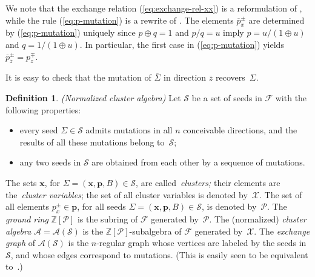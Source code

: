 \documentclass[letterpaper]{amsart}
\numberwithin{equation}{section}
\theoremstyle{definition}
\newtheorem{definition}[theorem]{Definition}
\def\AA{\mathcal{A}}
\def\ZZ{\mathbb{Z}}
\def\PP{\mathbb{P}}
\def\xx{\mathbf{x}}
\def\pp{\mathbf{p}}
\def\FFcal{\mathcal{F}}
\begin{document}
We note that the exchange relation (\ref{eq:exchange-rel-xx}) is a 
reformulation of \cite[(2.2),(4.2)]{fz-clust1}, 
while the rule (\ref{eq:p-mutation}) is a rewrite of \cite[(5.4), 
(5.5)]{fz-clust1}. 
The elements $\overline p^\pm_x$ are determined by 
(\ref{eq:p-mutation}) uniquely since $p \oplus q = 1$ and 
$p/q = u$ imply $p = u/(1 \oplus u)$ and $q = 1/(1 \oplus u)$. 
In particular, the first case in (\ref{eq:p-mutation}) yields 
$\overline p_{\overline z}^\pm = p_z^\mp$. 
 
It is easy to check that the mutation of $\overline\Sigma$ in direction $\overline z$ recovers~$\Sigma$. 
 
\begin{definition} 
\label{def:cluster-algebra} 
\emph{(Normalized cluster algebra)} 
Let $\mathcal{S}$ be a set of seeds in $\mathcal{F}$ with 
the following properties: 
\begin{itemize} 
\item 
every seed $\Sigma\in\mathcal{S}$ admits mutations in all $n$ 
conceivable directions, and the results of all these mutations belong 
to~$\mathcal{S}$; 
\item 
any two seeds in $\mathcal{S}$ are obtained from each other by a 
sequence of mutations. 
\end{itemize} 
The sets $\xx$, for $\Sigma=(\xx, \pp, B)\in\mathcal{S}$, 
are called~\emph{clusters;} their elements are the~\emph{cluster 
  variables}; 
the set of all cluster variables is denoted by~$\mathcal{X}$. 
The set of all elements $p^\pm_x\!\in\! \pp$, for all seeds 
$\Sigma=(\xx, \pp, B)\!\in\!\mathcal{S}$, is denoted 
by~$\mathcal{P}$. 
The \emph{ground ring} $\ZZ[\mathcal{P}]$ is the subring of $\FFcal$ 
generated by~$\mathcal{P}$. 
The (normalized) \emph{cluster algebra} 
$\AA=\AA(\mathcal{S})$ 
is the $\ZZ[\mathcal{P}]$-subalgebra of $\FFcal$ generated 
by~$\mathcal{X}$. 
The \emph{exchange graph} of $\AA(\mathcal{S})$ 
is the $n$-regular graph whose vertices are labeled by the seeds 
in~$\mathcal{S}$, and whose edges correspond to mutations. (This 
is easily seen to be equivalent 
to~\cite[Definition~7.4]{fz-clust1}.) 
\end{definition} 
 
\end{document}
